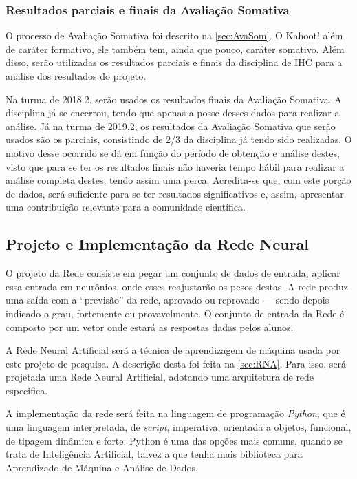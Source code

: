 \documentclass[
	12pt,				%
	openright,			%
	oneside,
	a4paper,			%
	english,			%
	french,				%
	spanish,			%
	brazil,				%
	]{abntex2}
\begin{document}
\subsubsection{Resultados parciais e finais da Avaliação Somativa}

O processo de Avaliação Somativa foi descrito na \autoref{sec:AvaSom}. O Kahoot! além de caráter formativo, ele também tem, ainda que pouco, caráter somativo. Além disso, serão utilizadas os resultados parciais e finais da disciplina de IHC para a analise dos resultados do projeto.

Na turma de 2018.2, serão usados os resultados finais da Avaliação Somativa. A disciplina já se encerrou, tendo que apenas a posse desses dados para realizar a análise. Já na turma de 2019.2, os resultados da Avaliação Somativa que serão usados são os parciais, consistindo de 2/3 da disciplina já tendo sido realizadas. O motivo desse ocorrido se dá em função do período de obtenção e análise destes, visto que para se ter os resultados finais não haveria tempo hábil para realizar a análise completa destes, tendo assim uma perca. Acredita-se que, com este porção de dados, será suficiente para se ter resultados significativos e, assim, apresentar uma contribuição relevante para a comunidade científica.
 
\subsection{Projeto e Implementação da Rede Neural}

O projeto da Rede consiste em pegar um conjunto de dados de entrada, aplicar essa entrada em neurônios, onde esses reajustarão os pesos destas. A rede produz uma saída com a ``previsão'' da rede, aprovado ou reprovado --- sendo depois indicado o grau, fortemente ou provavelmente. O conjunto de entrada da Rede é composto por um vetor onde estará as respostas dadas pelos alunos.

A Rede Neural Artificial será a técnica de aprendizagem de máquina usada por este projeto de pesquisa. A descrição desta foi feita na \autoref{sec:RNA}. Para isso, será projetada uma Rede Neural Artificial, adotando uma arquitetura de rede especifica.

A implementação da rede será feita na linguagem de programação \textit{Python}, que é uma linguagem interpretada, de \textit{script}, imperativa, orientada a objetos, funcional, de tipagem dinâmica e forte. Python é uma das opções mais comuns, quando se trata de Inteligência Artificial, talvez a que tenha mais biblioteca para Aprendizado de Máquina e Análise de Dados.
\end{document}
